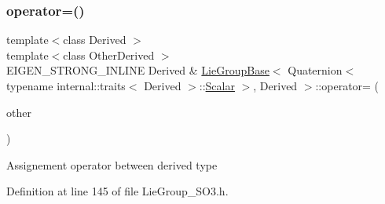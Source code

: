 \subsubsection{\texorpdfstring{operator=()}{operator=()}\hspace{0.1cm}{\footnotesize\ttfamily [2/3]}}
{\footnotesize\ttfamily template$<$class Derived $>$ \\
template$<$class Other\+Derived $>$ \\
E\+I\+G\+E\+N\+\_\+\+S\+T\+R\+O\+N\+G\+\_\+\+I\+N\+L\+I\+NE Derived \& \hyperlink{class_lie_group_base}{Lie\+Group\+Base}$<$ Quaternion$<$ typename internal\+::traits$<$ Derived $>$\+::\hyperlink{class_lie_group_base_3_01_quaternion_3_01typename_01internal_1_1traits_3_01_derived_01_4_1_1_scalar_01_4_00_01_derived_01_4_afadeceb3b98e52deecc572e71efb82a8}{Scalar} $>$, Derived $>$\+::operator= (\begin{DoxyParamCaption}\item[{const \hyperlink{class_lie_group_base}{Lie\+Group\+Base}$<$ \hyperlink{class_lie_group_base_3_01_quaternion_3_01typename_01internal_1_1traits_3_01_derived_01_4_1_1_scalar_01_4_00_01_derived_01_4_a1a65624391a6a8eb63eb312f919c4855}{Base\+Type}, Other\+Derived $>$ \&}]{other }\end{DoxyParamCaption})}

Assignement operator between derived type 

Definition at line 145 of file Lie\+Group\+\_\+\+S\+O3.\+h.

\hypertarget{class_lie_group_base_3_01_quaternion_3_01typename_01internal_1_1traits_3_01_derived_01_4_1_1_scalar_01_4_00_01_derived_01_4_a24e2a92feb274bd5ef0fa335522ee577}{}\label{class_lie_group_base_3_01_quaternion_3_01typename_01internal_1_1traits_3_01_derived_01_4_1_1_scalar_01_4_00_01_derived_01_4_a24e2a92feb274bd5ef0fa335522ee577} 
